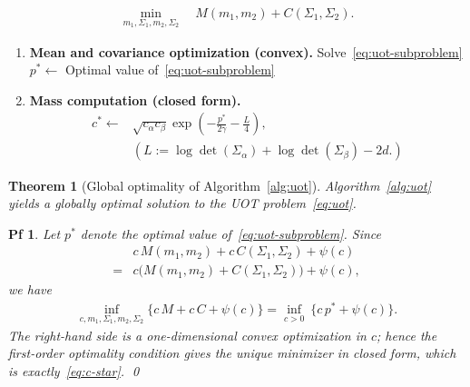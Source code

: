 \documentclass[10pt,a4paper]{amsart}
\newtheorem{thm}{Theorem}
\newtheorem{pf}{Pf}
\begin{document}
\begin{align}\label{eq:uot-subproblem}
    \min_{m_1,\Sigma_1,m_2,\Sigma_2}\quad M(m_1,m_2) + C(\Sigma_1,\Sigma_2).
\end{align}

\begin{algorithm}[h]
\caption{UOT between Gaussians}
\label{alg:uot}
\begin{enumerate}
\item \textbf{Mean and covariance optimization (convex).}
Solve~\eqref{eq:uot-subproblem} \\
\(p^*\longleftarrow\) Optimal value of~\eqref{eq:uot-subproblem}
\item \textbf{Mass computation (closed form).}
\begin{align}\label{eq:c-star}
    c^\ast \longleftarrow &\sqrt{c_\alpha c_\beta} \exp\left(-\frac{p^\ast}{2\gamma} - \frac{L}{4} \right), \\
    &(L := \log\det(\Sigma_\alpha)+\log\det(\Sigma_\beta)-2d.) \nonumber
\end{align}
\end{enumerate}
\end{algorithm}

\begin{thm}[Global optimality of Algorithm~\ref{alg:uot}]\label{thm:uot-global}
Algorithm~\ref{alg:uot} yields a globally optimal solution to the UOT problem~\eqref{eq:uot}.
\end{thm}

\begin{pf}
Let $p^\ast$ denote the optimal value of~\eqref{eq:uot-subproblem}. Since
\begin{align}
&c\,M(m_1,m_2) + c\,C(\Sigma_1,\Sigma_2) + \psi(c) \\
= &c\big(M(m_1,m_2)+C(\Sigma_1,\Sigma_2)\big) + \psi(c),
\end{align}
we have
\begin{align}
\inf_{c,m_1,\Sigma_1,m_2,\Sigma_2}
\big\{c\,M + c\,C + \psi(c)\big\}
=
\inf_{c>0}\ \Big\{ c\,p^\ast + \psi(c)\Big\}.
\label{eq:separation}
\end{align}
The right-hand side is a one-dimensional convex optimization in $c$; hence the first-order optimality condition
gives the unique minimizer in closed form, which is exactly~\eqref{eq:c-star}. \qed
\end{pf}
\end{document}
